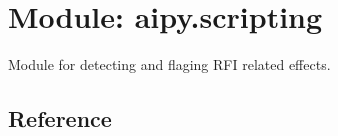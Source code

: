 \section{Module: aipy.scripting}
Module for detecting and flaging RFI related effects.

\subsection{Reference}

